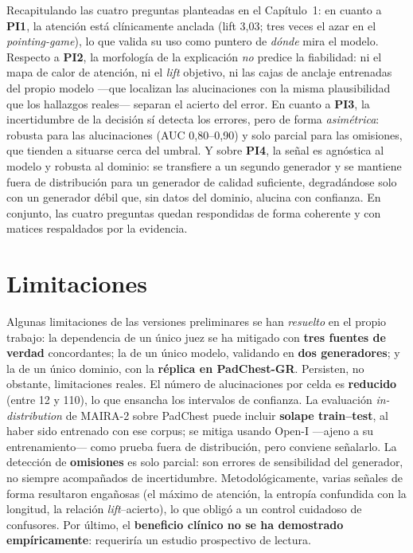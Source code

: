 Recapitulando las cuatro preguntas planteadas en el Capítulo~1: en cuanto a \textbf{PI1}, la atención
está clínicamente anclada (lift 3,03; tres veces el azar en el \textit{pointing-game}), lo que valida
su uso como puntero de \emph{dónde} mira el modelo. Respecto a \textbf{PI2}, la morfología de la
explicación \emph{no} predice la fiabilidad: ni el mapa de calor de atención, ni el \textit{lift}
objetivo, ni las cajas de anclaje entrenadas del propio modelo —que localizan las alucinaciones con
la misma plausibilidad que los hallazgos reales— separan el acierto del error. En cuanto a
\textbf{PI3}, la incertidumbre de la decisión sí detecta los errores, pero de forma \emph{asimétrica}:
robusta para las alucinaciones (AUC 0,80--0,90) y solo parcial para las omisiones, que tienden a
situarse cerca del umbral. Y sobre \textbf{PI4}, la señal es agnóstica al modelo y robusta al dominio:
se transfiere a un segundo generador y se mantiene fuera de distribución para un generador de calidad
suficiente, degradándose solo con un generador débil que, sin datos del dominio, alucina con
confianza. En conjunto, las cuatro preguntas quedan respondidas de forma coherente y con matices
respaldados por la evidencia.

\section{Limitaciones}
Algunas limitaciones de las versiones preliminares se han \emph{resuelto} en el propio trabajo: la
dependencia de un único juez se ha mitigado con \textbf{tres fuentes de verdad} concordantes; la de un
único modelo, validando en \textbf{dos generadores}; y la de un único dominio, con la \textbf{réplica
en PadChest-GR}. Persisten, no obstante, limitaciones reales. El número de alucinaciones por celda es
\textbf{reducido} (entre 12 y 110), lo que ensancha los intervalos de confianza. La evaluación
\emph{in-distribution} de MAIRA-2 sobre PadChest puede incluir \textbf{solape train--test}, al haber
sido entrenado con ese corpus; se mitiga usando Open-I —ajeno a su entrenamiento— como prueba fuera de
distribución, pero conviene señalarlo. La detección de \textbf{omisiones} es solo parcial: son errores
de sensibilidad del generador, no siempre acompañados de incertidumbre. Metodológicamente, varias
señales de forma resultaron engañosas (el máximo de atención, la entropía confundida con la longitud,
la relación \emph{lift}--acierto), lo que obligó a un control cuidadoso de confusores. Por último, el
\textbf{beneficio clínico no se ha demostrado empíricamente}: requeriría un estudio prospectivo de
lectura.

